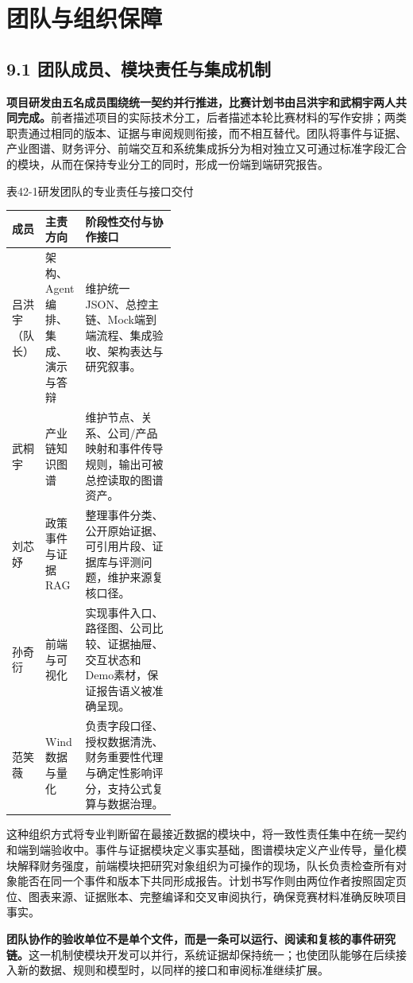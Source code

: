 \clearpage
\section{团队与组织保障}
\subsection*{9.1 团队成员、模块责任与集成机制}\label{page:42}
\noindent\textbf{项目研发由五名成员围绕统一契约并行推进，比赛计划书由吕洪宇和武桐宇两人共同完成。}前者描述项目的实际技术分工，后者描述本轮比赛材料的写作安排；两类职责通过相同的版本、证据与审阅规则衔接，而不相互替代。团队将事件与证据、产业图谱、财务评分、前端交互和系统集成拆分为相对独立又可通过标准字段汇合的模块，从而在保持专业分工的同时，形成一份端到端研究报告\cite{lhy-team}。

\begin{center}\small 表42-1\quad 研发团队的专业责任与接口交付\par\vspace{1mm}
\begin{tabularx}{\linewidth}{p{0.17\linewidth}p{0.24\linewidth}X}
\toprule
成员 & 主责方向 & 阶段性交付与协作接口\\
\midrule
吕洪宇（队长） & 架构、Agent编排、集成、演示与答辩 & 维护统一JSON、总控主链、Mock端到端流程、集成验收、架构表达与研究叙事。\\
武桐宇 & 产业链知识图谱 & 维护节点、关系、公司/产品映射和事件传导规则，输出可被总控读取的图谱资产。\\
刘芯妤 & 政策事件与证据RAG & 整理事件分类、公开原始证据、可引用片段、证据库与评测问题，维护来源复核口径。\\
孙奇衍 & 前端与可视化 & 实现事件入口、路径图、公司比较、证据抽屉、交互状态和Demo素材，保证报告语义被准确呈现。\\
范笑薇 & Wind数据与量化 & 负责字段口径、授权数据清洗、财务重要性代理与确定性影响评分，支持公式复算与数据治理。\\
\bottomrule
\end{tabularx}\end{center}

这种组织方式将专业判断留在最接近数据的模块中，将一致性责任集中在统一契约和端到端验收中。事件与证据模块定义事实基础，图谱模块定义产业传导，量化模块解释财务强度，前端模块把研究对象组织为可操作的现场，队长负责检查所有对象能否在同一个事件和版本下共同形成报告。计划书写作则由两位作者按照固定页位、图表来源、证据账本、完整编译和交叉审阅执行，确保竞赛材料准确反映项目事实。

\noindent\textbf{团队协作的验收单位不是单个文件，而是一条可以运行、阅读和复核的事件研究链。}这一机制使模块开发可以并行，系统证据却保持统一；也使团队能够在后续接入新的数据、规则和模型时，以同样的接口和审阅标准继续扩展。
